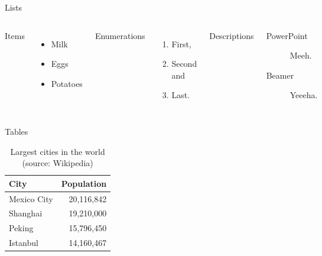\begin{frame}{Lists}
				\begin{columns}[T,onlytextwidth]
								Items
								\begin{itemize}
												\item Milk
												\item Eggs
												\item Potatoes
								\end{itemize}

								Enumerations
								\begin{enumerate}
												\item First,
												\item Second and
												\item Last.
								\end{enumerate}

								Descriptions
								\begin{description}
												\item[PowerPoint] Meeh.
												\item[Beamer] Yeeeha.
								\end{description}
				\end{columns}
\end{frame}
\begin{frame}{Tables}
				\begin{table}
								\caption{Largest cities in the world (source: Wikipedia)}
								\begin{tabular}{@{} lr @{}}
												\toprule
												City & Population\\
												\midrule
												Mexico City & 20,116,842\\
												Shanghai & 19,210,000\\
												Peking & 15,796,450\\
												Istanbul & 14,160,467\\
												\bottomrule
								\end{tabular}
				\end{table}
\end{frame}
